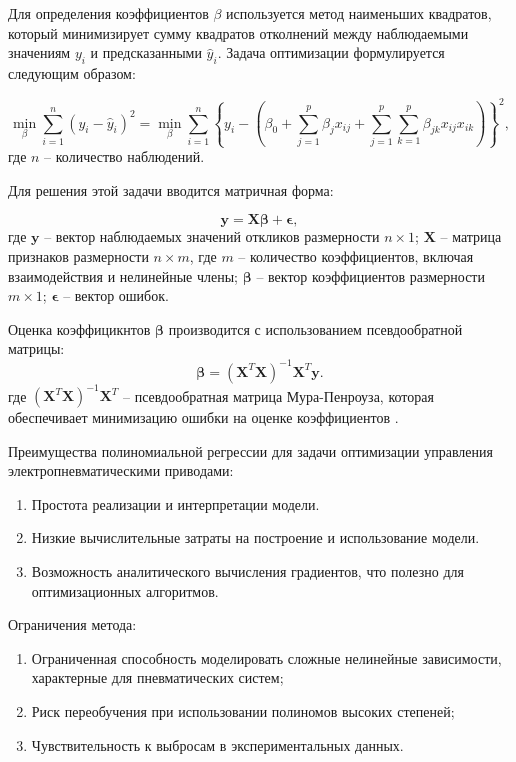 Для определения коэффициентов $\beta$ используется метод наименьших квадратов,
который минимизирует сумму квадратов отколнений между наблюдаемыми значениям $y_i$
и предсказанными $\hat{y}_i$. Задача оптимизации формулируется следующим образом:

\begin{equation*}
    \min_{\beta} \sum_{i=1}^{n} (y_i - \hat{y}_i)^2 =
    \min_{\beta} \sum_{i=1}^{n} \left\{
    y_i - \left(\beta_0 + \sum_{j=1}^{p} \beta_j x_{ij}
    + \sum_{j=1}^{p} \sum_{k=1}^{p} \beta_{jk} x_{ij} x_{ik}
    \right)
    \right\}^2,
\end{equation*}
где $n$ -- количество наблюдений.

Для решения этой задачи вводится матричная форма:

\begin{equation*}
    \mathbf{y} = \mathbf{X} \boldsymbol{\beta} + \boldsymbol{\epsilon},
\end{equation*}
где $\mathbf{y}$ -- вектор наблюдаемых значений откликов размерности $n \times 1$;
$\mathbf{X}$ -- матрица признаков размерности $n \times m$, где $m$ -- количество коэффициентов,
включая взаимодействия и нелинейные члены;
$\boldsymbol{\beta}$ -- вектор коэффициентов размерности $m \times 1$;
$\boldsymbol{\epsilon}$ -- вектор ошибок.

Оценка коэффицикнтов $\boldsymbol{\beta}$ производится с использованием псевдообратной матрицы:
\begin{equation*}
    \boldsymbol{\beta} = (\mathbf{X}^T \mathbf{X})^{-1} \mathbf{X}^T \mathbf{y}.
\end{equation*}
где $(\mathbf{X}^T \mathbf{X})^{-1} \mathbf{X}^T$ -- псевдообратная матрица Мура-Пенроуза,
которая обеспечивает минимизацию ошибки на оценке коэффициентов \cite{meyer2009matrix}.

Преимущества полиномиальной регрессии для задачи оптимизации управления электропневматическими приводами:
\begin{enumerate}
    \item Простота реализации и интерпретации модели.
    \item Низкие вычислительные затраты на построение и использование модели.
    \item Возможность аналитического вычисления градиентов, что полезно для оптимизационных алгоритмов.
\end{enumerate}

Ограничения метода:
\begin{enumerate}
    \item Ограниченная способность моделировать сложные нелинейные зависимости, характерные для пневматических систем;
    \item Риск переобучения при использовании полиномов высоких степеней;
    \item Чувствительность к выбросам в экспериментальных данных.
\end{enumerate}


